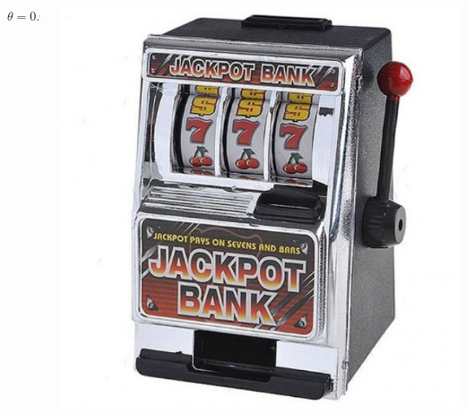 \documentclass[fullscreen=true, bookmarks=true, hyperref={pdfencoding=unicode}]{beamer}
\begin{document}
\begin{frame}
\begin{columns}
\begin{column}{.25\paperwidth}
\begin{center}
        $\theta = 0.02$
        \end{center}
      \end{column}
      \begin{column}{.25\paperwidth}
        \begin{center}
          \includegraphics[keepaspectratio,
                           width=.2\paperwidth]{data-kopilkabandit.jpg}


\end{center}
\end{column}
\end{columns}
\end{frame}
\end{document}
